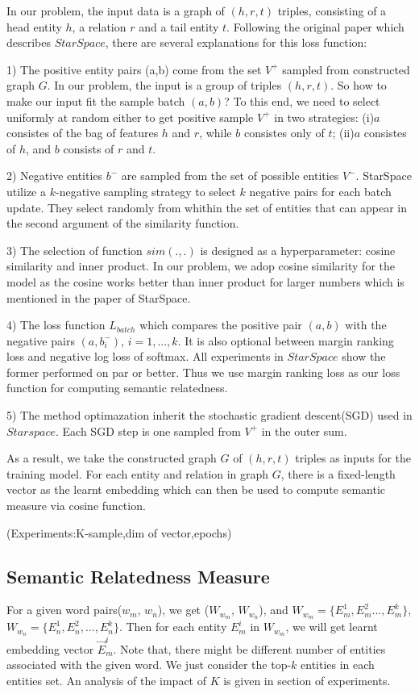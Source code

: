 In our problem, the input data is a graph of $(h, r, t)$ triples, consisting of a head entity $h$, 
a relation $r$ and a tail entity $t$.
Following the original paper which describes $StarSpace$, there are several explanations for this loss function:

1) The positive entity pairs (a,b) come from the set $V^+$ sampled from constructed graph $G$. 
In our problem, the input is a group of triples $(h, r, t)$. So how to make our input fit
the sample batch $(a, b)$? To this end, we need to select uniformly at random either to
get positive sample $V^+$ in two strategies:
(i)$a$ consistes of the bag of features $h$ and $r$, while $b$ consistes only of $t$; 
(ii)$a$ consistes of $h$, and $b$ consists of $r$ and $t$. 

2) Negative entities $b^-$ are sampled from the set of possible entities $V^-$.  
StarSpace utilize a $k$-negative sampling strategy\cite{corr/Mikolov13} to select $k$ negative pairs for each batch update. 
They select randomly from whithin the set of entities that can appear in the second argument of the similarity function.

3) The selection of function $sim(.,.)$ is designed as a hyperparameter: cosine similarity and inner product.
In our problem, we adop cosine similarity for the model as the cosine works better than inner product for
larger numbers which is mentioned in the paper of StarSpace.

4) The loss function $L_{batch}$ which compares the positive pair $(a,b)$ with the negative pairs $(a, b_i^-)$, $i=1,...,k$.
It is also optional between margin ranking loss and negative log loss of softmax. All experiments in $StarSpace$ show
the former performed on par or better. Thus we use margin ranking loss as our loss function for computing semantic relatedness.

5) The method optimazation inherit the stochastic gradient descent(SGD) used in $Starspace$. Each SGD step is one
sampled from $V^+$ in the outer sum.

As a result, we take the constructed graph $G$ of $(h, r, t)$ triples as inputs for the training model.
For each entity and relation in graph $G$, there is a fixed-length vector as the learnt embedding which
can then be used to compute semantic measure via cosine function.

(Experiments:K-sample,dim of vector,epochs)


\subsection{Semantic Relatedness Measure}
For a given word pairs($w_m$, $w_n$), we get ($W_{w_m}$, $W_{w_n}$), and $W_{w_m}=\{E_m^1,E_m^2...,E_m^k\}$,
$W_{w_n}=\{E_n^1,E_n^2,...,E_n^k\}$. Then for each entity $E_m^i$ in $W_{w_m}$, we will get learnt embedding vector
$\overrightarrow E_m^i$.
Note that, there might be different number of entities associated with the given
word. We just consider the top-$k$ entities in each entities set. An analysis of the impact of $K$ is
given in section of experiments.

